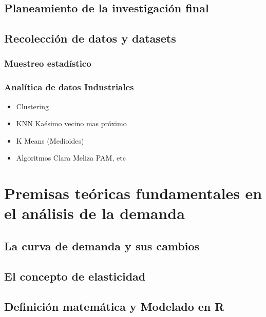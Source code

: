 \documentclass[crop=false]{standalone}
\begin{document}
\blindtext



\subsection{Planeamiento de la investigación final}

\blindtext



\subsection{Recolección de datos y datasets}

\blindtext



\subsubsection{Muestreo estadístico}

\blindtext



\subsubsection{Analítica de datos Industriales}

\begin{itemize}
    \item Clustering
    \item KNN Kaésimo vecino mas próximo
    \item K Means (Medioides)
    \item Algoritmos Clara Meliza PAM, etc
\end{itemize}


\blindtext

\section{Premisas teóricas fundamentales en el análisis de la demanda}


\subsection{ La curva de demanda y sus cambios}
\subsection{El concepto de elasticidad}
\subsection{Definición matemática y Modelado en R}
\end{document}
